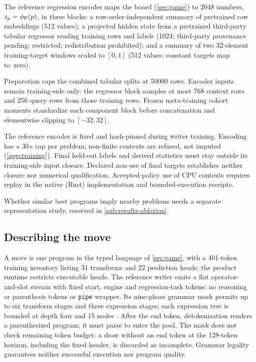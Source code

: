 The reference regression encoder maps the board (\cref{sec:game}) to
\num{2048} numbers, $z_p=\phi_{\mathrm{P}}(p)$, in three blocks: a row-order-independent
summary of pretrained row embeddings (512 values); a projected hidden
state from a pretrained third-party tabular regressor reading training
rows and labels (\num{1024}; third-party provenance pending; restricted; redistribution prohibited);
and a summary of two 32-element training-target windows scaled to $[0,1]$
(512 values; constant targets map to~zero).

Preparation caps the combined tabular splits at \num{50000} rows. Encoder
inputs remain training-side only: the regressor block samples at most
768 context rows and 256 query rows from those training rows. Frozen
meta-training cohort moments standardize each component block before
concatenation and elementwise clipping to $[-32,32]$.

The reference encoder is fixed and hash-pinned during writer training.
Encoding has a 30\,s cap per problem; non-finite contexts are refused,
not imputed (\cref{app:training}). Final held-out labels and derived
statistics must stay outside its training-side input closure. Declared
non-use of final targets establishes neither closure nor numerical
qualification. Accepted-policy use of CPU contexts requires replay in the native (Rust) implementation
and bounded-execution \mbox{receipts}.

Whether similar best programs imply nearby problems needs a separate
representation study, reserved in \mbox{\cref{sub:results-ablation}}.

\subsection{Describing the move}\label{sub:method-move}

A move is one program in the typed language of \cref{sec:game}, with a
401-token training inventory listing 31 transforms and 22 prediction heads; the product runtime restricts executable heads.
The reference writer emits a flat operator-and-slot stream with fixed
start, engine and regression-task tokens: no reasoning or parenthesis
tokens or \texttt{pipe} wrapper. Its nine-phase grammar mask permits
up to six transform stages and three expression stages; each expression
tree is bounded at depth four and 15 nodes
\citep{kusner2017grammar,dai2018sdvae}. After the end token, detokenization
renders a parenthesized program; it must parse to enter the pool.
The mask does not check remaining token budget: a draw without an end token
at the 128-token horizon, including the fixed header, is discarded as
incomplete. Grammar legality guarantees neither successful execution nor
program quality.

